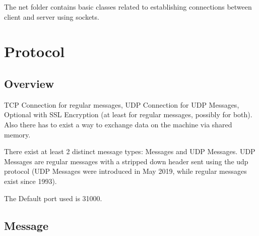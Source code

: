 \renewcommand{\namespace}{kernel::net::}


\newenvironment{messagetypes}{\rowcolors{2}{evnt.light}{evnt.dark}\mbox{}\\
	\begin{longtable}{||p{7.4cm}|p{.5cm}|p{6cm}||} 
		\rowcolor{evnt.head} \hline \textbf{Name} & \textbf{ID} & \textbf{Comment} \\ \hline\hline}{\end{longtable}}

\newenvironment{messagedesc}{\rowcolors{2}{evnt.light}{evnt.dark}\mbox{}\\
	\begin{longtable}{||p{3.4cm}|p{2.5cm}|p{8cm}||}
		\rowcolor{evnt.head} \hline \textbf{Name} & \textbf{Length} & \textbf{Comment} \\ \hline\hline}{\end{longtable}}

\newcommand{\messageType}[3]{\lstinline|#1| & #2 & #3 \\
	\hline}

The net folder contains basic classes related to establishing connections between client and server using sockets.

\section{Protocol}

\subsection{Overview}

TCP Connection for regular messages, UDP Connection for UDP Messages, Optional with SSL Encryption (at least for regular messages, possibly for both). Also there has to exist a way to exchange data on the machine via shared memory.

There exist at least 2 distinct message types: Messages and UDP Messages. UDP Messages are regular messages with a stripped down header sent using the udp protocol (UDP Messages were introduced in May 2019, while regular messages exist since 1993).

The Default port used is 31000.



\subsection{Message}

